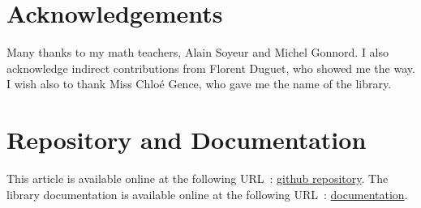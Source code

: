 \documentclass[twocolumn, switch]{article}
\begin{document}
\section*{Acknowledgements}
\footnotesize
Many thanks to my math teachers, Alain Soyeur and Michel Gonnord. I also acknowledge indirect contributions from Florent Duguet, who showed me the way. I wish also to thank Miss Chloé Gence, who gave me the name of the library.
\normalsize

\section*{Repository and Documentation}
\footnotesize
This article is available online at the following URL~: \href{https://github.com/aerobus-open-source/aerobus}{github repository}.
The library documentation is available online at the following URL~: \href{https://aerobus-open-source.github.io/aerobus/docs/}{documentation}.
\normalsize


\end{document}
